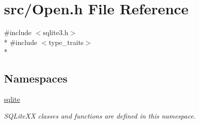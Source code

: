 \hypertarget{a00028}{\section{src/\-Open.h File Reference}
\label{a00028}
}
{\ttfamily \#include $<$sqlite3.\-h$>$}\\*
{\ttfamily \#include $<$type\-\_\-traits$>$}\\*
\subsection*{Namespaces}
\begin{DoxyCompactItemize}
\item 
\hyperlink{a00038}{sqlite}
\begin{DoxyCompactList}\small\item\em S\-Q\-Lite\-X\-X classes and functions are defined in this namespace. \end{DoxyCompactList}\end{DoxyCompactItemize}
